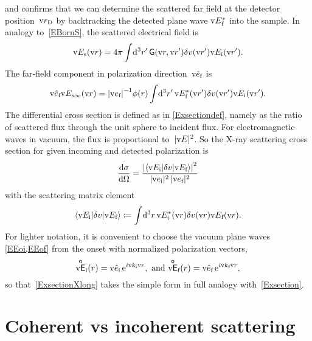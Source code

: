 and confirms that we can determine the scattered far field at the detector position~$\text{v}{r}_\text{D}$
by backtracking the detected plane wave $\text{v}{E}_{\text{f}}^*$ into the sample.
In analogy to~\cref{EBornS}, the scattered electrical field is
\begin{equation}\label{EBornX}
  \text{v}{E}_{\text{s}}(\text{v}{r})
  = 4\pi\int\!\mathrm d^3r'\, \mathsf{G}(\text{v}{r},\text{v}{r}')\delta v(\text{v}{r}')\text{v}{E}_{\text{i}}(\text{v}{r}').
\end{equation}
The far-field component in polarization direction~$\text{v}{\hat e}_{\text{f}}$ is
\begin{equation}
  \text{v}{\hat e}_{\text{f}}\text{v}{E}_{\text{s}\infty}(\text{v}{r})
  = {|\text{v}{e}_{\text{f}}|}^{-1}\phi(r) \int\!\mathrm d^3r'\, \text{v}{E}_{\text{f}}^*(\text{v}{r}')\delta v(\text{v}{r}')\text{v}{E}_{\text{i}}(\text{v}{r}').
\end{equation}
The differential cross section
is defined as in \cref{Exsectiondef},
namely as the ratio of scattered flux through the unit sphere to incident flux.
For electromagnetic waves in vacuum, the flux is proportional to~$|\text{v}{E}|^2$.
So the X-ray scattering cross section for given incoming and detected polarization is
\begin{equation}\label{ExsectionXlong}
  \frac{\mathrm d\sigma}{\mathrm d\Omega}
  =  \frac{ {\left|\left\langle\text{v}{E}_{\text{i}}|\delta v|\text{v}{E}_{\text{f}}\right\rangle\right|}^2 }{|\text{v}{e}_{\text{i}}|^2\,|\text{v}{e}_{\text{f}}|^2}
\end{equation}
with the scattering matrix element
%
\begin{equation}\label{EtramaE}
  \left\langle \text{v}{E}_{\text{i}}|\delta v|\text{v}{E}_{\text{f}}\right\rangle
  \coloneqq  \int\!\mathrm d^3r\, \text{v}{E}_{\text{i}}^*(\text{v}{r})\delta v(\text{v}{r})\text{v}{E}_{\text{f}}(\text{v}{r}).
\end{equation}
For lighter notation,
it is convenient to choose the vacuum plane waves \cref{EEoi,EEof} from the onset
with normalized polarization vectors,
\begin{equation}
  \mathsf{\overset{o}{\text{v}{E}}}_{\text{i}}(r) = \text{v}{\hat e}_{\text{i}}\, \mathrm e^{i\text{v}{k}_{\text{i}}\text{v}{r}}, \text{~and~}
  \mathsf{\overset{o}{\text{v}{E}}}_{\text{f}}(r) = \text{v}{\hat e}_{\text{f}}\, \mathrm e^{i\text{v}{k}_{\text{f}}\text{v}{r}},
\end{equation}
so that~\cref{ExsectionXlong}
takes the simple form
in full analogy with~\cref{Exsection}.
%

\section{Coherent vs incoherent scattering}\label{Scoherlen}


